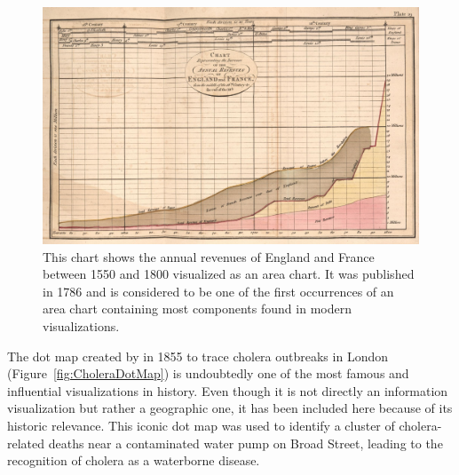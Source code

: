 \begin{figure}[tp]
\centering
\includegraphics[keepaspectratio,width=\linewidth,height=\fullh / 3]{images/playfair-area-chart.png}
\caption[Area Chart by William Playfair from 1786]{
  This chart shows the annual revenues of England and France between 1550 and 1800 visualized as an area chart.
  It was published in 1786 and is considered to be one of the first occurrences of an area chart containing most components found in modern visualizations.
}
\label{fig:PlayfairAreaChart}
\end{figure}

The dot map created by \textcite{ModeOfCommunicationOfCholera} in 1855 to trace cholera outbreaks in London (Figure~\ref{fig:CholeraDotMap}) is undoubtedly one of the most famous and influential visualizations in history.
Even though it is not directly an information visualization but rather a geographic one, it has been included here because of its historic relevance.
This iconic dot map was used to identify a cluster of cholera-related deaths near a contaminated water pump on Broad Street, leading to the recognition of cholera as a waterborne disease.

